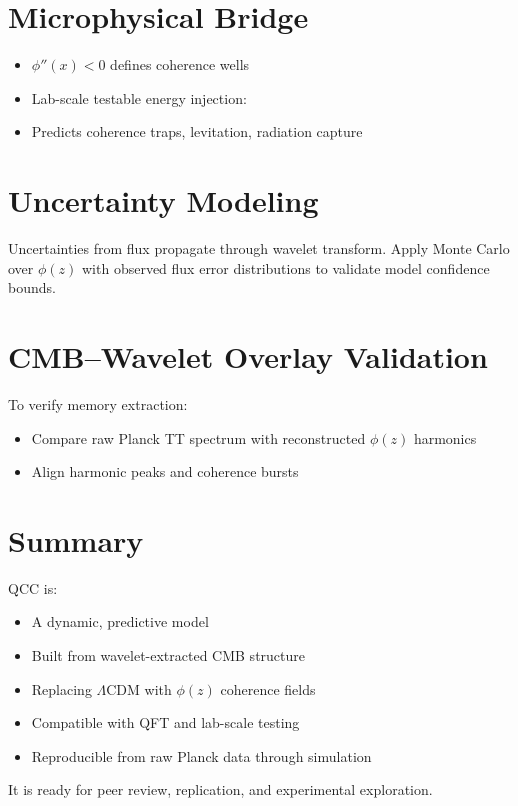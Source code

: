 \documentclass[12pt]{article}
\begin{document}
	\section{Microphysical Bridge}
	\begin{itemize}
		\item $\phi''(x) < 0$ defines coherence wells
		\item Lab-scale testable energy injection:
		
		\item Predicts coherence traps, levitation, radiation capture
	\end{itemize}
	
	\section{Uncertainty Modeling}
	
	Uncertainties from flux propagate through wavelet transform. Apply Monte Carlo over $\phi(z)$ with observed flux error distributions to validate model confidence bounds.
	
	\section{CMB–Wavelet Overlay Validation}
	To verify memory extraction:
	\begin{itemize}
		\item Compare raw Planck TT spectrum with reconstructed $\phi(z)$ harmonics
		\item Align harmonic peaks and coherence bursts
	\end{itemize}
	
	\section{Summary}
	QCC is:
	\begin{itemize}
		\item A dynamic, predictive model
		\item Built from wavelet-extracted CMB structure
		\item Replacing $\Lambda$CDM with $\phi(z)$ coherence fields
		\item Compatible with QFT and lab-scale testing
		\item Reproducible from raw Planck data through simulation
	\end{itemize}
	It is ready for peer review, replication, and experimental exploration.
	
\end{document}
